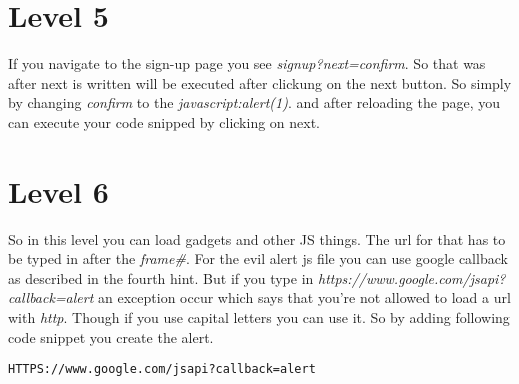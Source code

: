 \section{Level 5}
If you navigate to the sign-up page you see \textit{signup?next=confirm}. So that was after next is written will be executed after clickung on the next button. So simply by changing \textit{confirm} to the \textit{javascript:alert(1)}. and after reloading the page, you can execute your code snipped by clicking on next.


\section{Level 6}
So in this level you can load gadgets and other JS things. The url for that has to be typed in after the \textit{frame\#\/}. For the evil alert js file you can use google callback as described in the fourth hint.
But if you type in \textit{https://www.google.com/jsapi?callback=alert} an exception occur which says that you're not allowed to load a url with \textit{http}. Though if you use capital letters you can use it.
So by adding following code snippet you create the alert.
\begin{lstlisting}
HTTPS://www.google.com/jsapi?callback=alert
\end{lstlisting}
